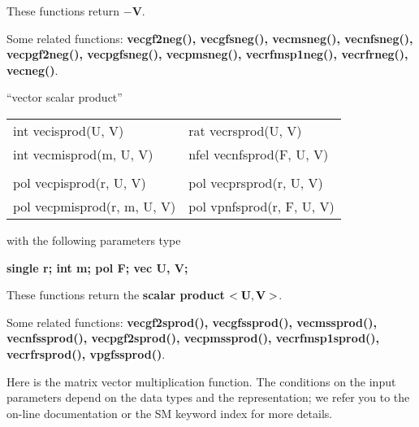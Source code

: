 These functions return {\bf $-$V}.

Some related functions:\hspace*{0.7em}
{\bf  vecgf2neg(), vecgfsneg(), vecmsneg(), vecnfsneg(), \\
vecpgf2neg(), vecpgfsneg(), vecpmsneg(), vecrfmsp1neg(), vecrfrneg(), \\
vecneg()}.

\newpage

\begin{center} ``vector scalar product'' \end{center}
\begin{center}
{\bf
\begin{tabular}{ll}
int vecisprod(U, V)   & rat vecrsprod(U, V)   \\
int vecmisprod(m, U, V) & nfel vecnfsprod(F, U, V) \\
&\\
pol vecpisprod(r, U, V)   & pol vecprsprod(r, U, V) \\
pol vecpmisprod(r, m, U, V) &  pol vpnfsprod(r, F, U, V) \\
\end{tabular} }
\end{center}
\parbox[t]{2.5in}{with the following parameters type}
\parbox[t]{3.0in}{
\bf single r;\newline
    int m;\newline
    pol F;\newline
    vec U, V;}

These functions return the {\bf scalar product} $<\mbox{\bf U}, \mbox{\bf V}>$.

Some related functions:\hspace*{0.7em}
{\bf  vecgf2sprod(), vecgfssprod(), vecmssprod(), \\
vecnfssprod(),
        vecpgf2sprod(), vecpmssprod(), vecrfmsp1sprod(), \\
vecrfrsprod(), vpgfssprod()}.



\leer
Here is the matrix vector multiplication function. The conditions on the 
input parameters depend on the data types and the representation; we refer
you to the on-line documentation or the SM keyword index for more details.


